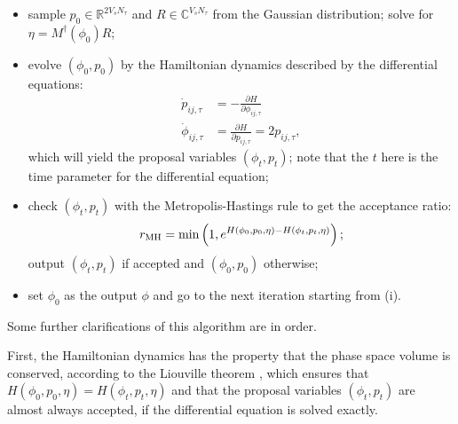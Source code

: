 \documentclass[aps,prl,twocolumn,superscriptaddress,showpacs,longbibliography]{revtex4-2}
\newcommand{\tx}[1]{\textmd{#1}}
\begin{document}
\begin{itemize}
\item[(i)] sample $p_0 \in \mathbb{R}^{2V_sN_\tau}$ and $R\in \mathbb{C}^{V_sN_\tau}$ from the Gaussian distribution; solve for $\eta = M^{\dagger}(\phi_0) R$;

\item[(ii)] evolve $(\phi_0, p_0)$ by the Hamiltonian dynamics described by the differential equations:
\begin{align}
\dot{p}_{ij, \tau} & =-\frac{\partial H }{\partial \phi_{ij, \tau}} \\
\dot{\phi}_{ij, \tau} & =\frac{\partial H }{\partial p_{ij, \tau}} = 2p_{ij, \tau}, \label{eq:H_diff}
\end{align}
which will yield the proposal variables $(\phi_t, p_t)$; note that the $t$ here is the time parameter for the differential equation;

\item[(iii)] check $(\phi_t, p_t)$ with the Metropolis-Hastings rule to get the acceptance ratio:
\begin{align}
    r_\tx{MH}=\min \left(1, e^{ H (\phi_0, p_0, \eta)- H \left(\phi_t, p_t, \eta\right)}\right);
\end{align}
output $(\phi_t, p_t)$ if accepted and $(\phi_0, p_0)$ otherwise;

\item[(iv)] set $\phi_0$ as the output $\phi$ and go to the next iteration starting from (i).
\end{itemize}

Some further clarifications of this algorithm are in order.

First, the Hamiltonian dynamics has the property that the phase space volume is conserved, according to the Liouville theorem \cite{Beyl2018}, which ensures that $H (\phi_0, p_0, \eta)= H \left(\phi_t, p_t, \eta\right)$ and that the proposal variables $(\phi_t, p_t)$ are almost always accepted, if the differential equation is solved exactly.
\end{document}
